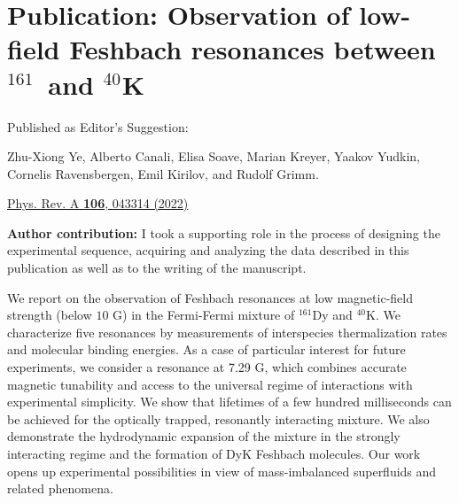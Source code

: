 \chapter{Publication: Observation of low-field Feshbach resonances between $^{161}$\Dy\, and $^{40}$K}
\label{Chpt:Lowfieldpaper}

\begin{flushleft}
	\noindent
	{\Large Published as Editor's Suggestion:\linebreak}
	
	{\Large Zhu-Xiong Ye, Alberto Canali, Elisa Soave, Marian Kreyer, Yaakov Yudkin, Cornelis Ravensbergen, Emil Kirilov, and Rudolf Grimm.\linebreak}
	
	{\Large\href{https://doi.org/10.1103/PhysRevA.106.043314}{Phys. Rev. A \textbf{106}, 043314 (2022)}\linebreak}
	
	
	\vfill
	
	\noindent
	{\large \textbf{Author contribution:}}
	I took a supporting role in the process of designing the experimental sequence, acquiring and analyzing the data described in this publication as well as to the writing of the manuscript. \linebreak
	\noindent
	
	
\end{flushleft}


\newpage
\begin{minipage}{10cm}
We report on the observation of Feshbach resonances at low magnetic-field strength (below $10$ G) in the
Fermi-Fermi mixture of $^{161}$Dy and $^{40}$K. We characterize five resonances by measurements of interspecies
thermalization rates and molecular binding energies. As a case of particular interest for future experiments,
we consider a resonance at 7.29 G, which combines accurate magnetic tunability and access to the universal
regime of interactions with experimental simplicity. We show that lifetimes of a few hundred milliseconds can
be achieved for the optically trapped, resonantly interacting mixture. We also demonstrate the hydrodynamic
expansion of the mixture in the strongly interacting regime and the formation of DyK Feshbach molecules. Our
work opens up experimental possibilities in view of mass-imbalanced superfluids and related phenomena.
\end{minipage}


